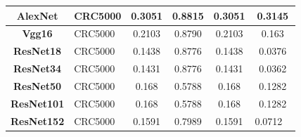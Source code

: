 \begin{table}[h!]
\begin{tabular}{|c|l|c|c|c|c|}
\textbf{AlexNet}      & CRC5000                                    & 0.3051       & 0.8815             & 0.3051          & 0.3145            \\ \hline
\textbf{Vgg16}      & CRC5000                                    & 0.2103       & 0.8790             & 0.2103          & 0.163            \\ \hline
\textbf{ResNet18}     & CRC5000                                    & 0.1438       & 0.8776             & 0.1438          & 0.0376            \\ \hline
\textbf{ResNet34}     & CRC5000                                    & 0.1431       & 0.8776             & 0.1431          & 0.0362            \\ \hline
\textbf{ResNet50}     & CRC5000                                    & 0.168       & 0.5788             & 0.168          & 0.1282            \\ \hline
\textbf{ResNet101}    & CRC5000                                     & 0.168       & 0.5788             & 0.168          & 0.1282            \\ \hline
\textbf{ResNet152}    & CRC5000                                    & 0.1591       & 0.7989             & 0.1591          & 0.0712 \           \\ \hline
\end{tabular}
\end{table}


